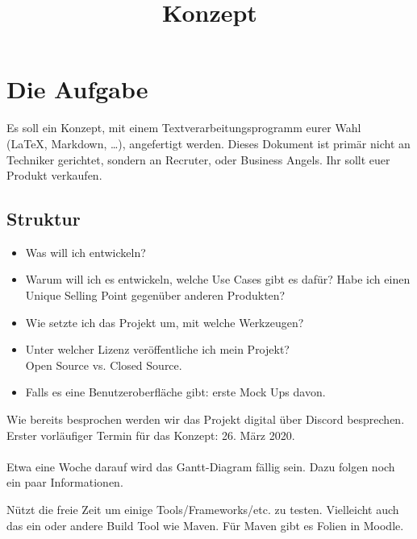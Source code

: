 \documentclass[12pt, oneside]{article}
\title{Konzept}
\begin{document}
 \setlength{\parindent}{0em} 
\maketitle

\section{Die Aufgabe}
Es soll ein Konzept, mit einem Textverarbeitungsprogramm eurer Wahl \\(\LaTeX, Markdown, \ldots), angefertigt werden. Dieses Dokument ist primär nicht an Techniker gerichtet, sondern an Recruter, oder Business Angels. Ihr sollt euer \\ Produkt verkaufen.

\subsection*{Struktur}
\begin{itemize}
	\item Was will ich entwickeln?
	\item Warum will ich es entwickeln, welche Use Cases gibt es dafür? Habe ich einen Unique Selling Point gegenüber anderen Produkten?
	\item Wie setzte ich das Projekt um, mit welche Werkzeugen?
	\item Unter welcher Lizenz veröffentliche ich mein Projekt?\\ Open Source vs. Closed Source.
	\item Falls es eine Benutzeroberfläche gibt: erste Mock Ups davon.
\end{itemize}

Wie bereits besprochen werden wir das Projekt digital über Discord besprechen. \\ Erster vorläufiger Termin für das Konzept: 26. März 2020. 
\\ \\Etwa eine Woche darauf wird das Gantt-Diagram fällig sein. Dazu folgen noch ein paar Informationen.
\\
\begin{tcolorbox}
	Nützt die freie Zeit um einige Tools/Frameworks/etc. zu testen. Vielleicht auch das ein oder andere Build Tool wie Maven. Für Maven gibt es Folien in Moodle.
\end{tcolorbox}
\end{document}
